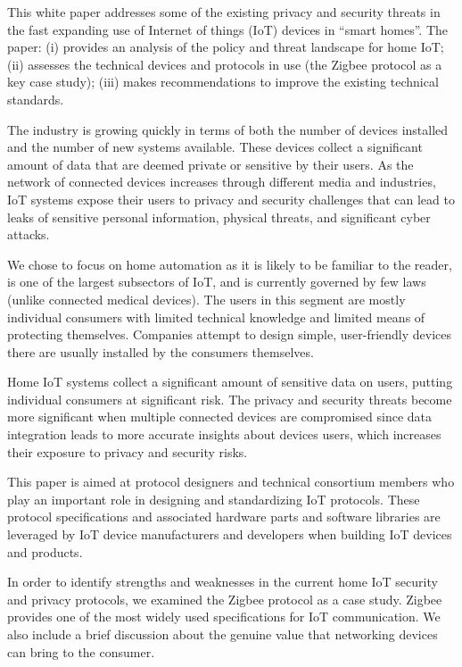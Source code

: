 This white paper addresses some of the existing privacy and security threats in the fast expanding use of Internet of things (IoT) devices in “smart homes”. 
The paper: (i) provides an analysis of the policy and threat landscape for home IoT; (ii) assesses the technical devices and protocols in use (the Zigbee protocol as a key case study); (iii) makes recommendations to improve the existing technical standards. 

The industry is growing quickly in terms of both the number of devices installed and the number of new systems available. 
These devices collect a significant amount of data that are deemed private or sensitive by their users. 
As the network of connected devices increases through different media and industries, IoT systems expose their users to privacy and security challenges that can lead to leaks of sensitive personal information, physical threats, and significant cyber attacks.

We chose to focus on home automation as it is likely to be familiar to the reader, is one of the largest subsectors of IoT, and is currently governed by few laws (unlike connected medical devices).
The users in this segment are mostly individual consumers with limited technical knowledge and limited means of protecting themselves. 
Companies attempt to design simple, user-friendly devices there are usually installed by the consumers themselves.

Home IoT systems collect a significant amount of sensitive data on users, putting individual consumers at significant risk. 
The privacy and security threats become more significant when multiple connected devices are compromised since data integration leads to more accurate insights about devices users, which increases their exposure to privacy and security risks.

This paper is aimed at protocol designers and technical consortium members who play an important role in designing and standardizing IoT protocols. 
These protocol specifications and associated hardware parts and software libraries are leveraged by IoT device manufacturers and developers when building IoT devices and products.

In order to identify strengths and weaknesses in the current home IoT security and privacy protocols, we examined the Zigbee protocol as a case study.
Zigbee provides one of the most widely used specifications for IoT communication. 
We also include a brief discussion about the genuine value that networking devices can bring to the consumer.

